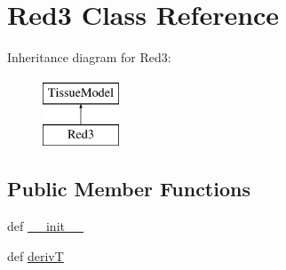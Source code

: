 \hypertarget{classcell__mdl_1_1_red3}{
\section{Red3 Class Reference}
\label{classcell__mdl_1_1_red3}
}
Inheritance diagram for Red3:\begin{figure}[H]
\begin{center}
\leavevmode
\includegraphics[height=2cm]{classcell__mdl_1_1_red3}
\end{center}
\end{figure}
\subsection*{Public Member Functions}
\begin{DoxyCompactItemize}
\item 
def \hyperlink{classcell__mdl_1_1_red3_ac775ee34451fdfa742b318538164070e}{\_\-\_\-init\_\-\_\-}
\item 
def \hyperlink{classcell__mdl_1_1_red3_ad67701a6bb599a16a9eb386aa1cd4328}{derivT}
\end{DoxyCompactItemize}
